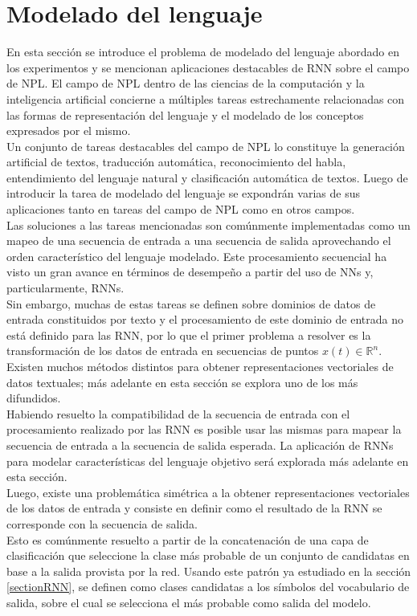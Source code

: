 \documentclass{article}
\begin{document}
	\pagebreak
	
	\section{Modelado del lenguaje}\label{sectionLanguageModeling}
	En esta sección se introduce el problema de modelado del lenguaje abordado en los experimentos y se mencionan aplicaciones destacables de RNN sobre el campo de NPL. El campo de NPL dentro de las ciencias de la computación y la inteligencia artificial concierne a múltiples tareas estrechamente relacionadas con las formas de representación del lenguaje y el modelado de los conceptos expresados por el mismo. \\
	Un conjunto de tareas destacables del campo de NPL lo constituye la generación artificial de textos, traducción automática, reconocimiento del habla, entendimiento del lenguaje natural y clasificación automática de textos. Luego de introducir la tarea de modelado del lenguaje se expondrán varias de sus aplicaciones tanto en tareas del campo de NPL como en otros campos.\\
	
	Las soluciones a las tareas mencionadas son comúnmente implementadas como un mapeo de una secuencia de entrada a una secuencia de salida aprovechando el orden característico del lenguaje modelado. Este procesamiento secuencial ha visto un gran avance en términos de desempeño a partir del uso de NNs y, particularmente, RNNs.\\
	Sin embargo, muchas de estas tareas se definen sobre dominios de datos de entrada constituidos por texto y el procesamiento de este dominio de entrada no está definido para las RNN, por lo que el primer problema a resolver es la transformación de los datos de entrada en secuencias de puntos $x(t) \in \mathbb{R}^n$.\\
	Existen muchos métodos distintos para obtener representaciones vectoriales de datos textuales; más adelante en esta sección se explora uno de los más difundidos.\\
	
	Habiendo resuelto la compatibilidad de la secuencia de entrada con el procesamiento realizado por las RNN es posible usar las mismas para mapear la secuencia de entrada a la secuencia de salida esperada. La aplicación de RNNs para modelar características del lenguaje objetivo será explorada más adelante en esta sección.\\
	
	Luego, existe una problemática simétrica a la obtener representaciones vectoriales de los datos de entrada y consiste en definir como el resultado de la RNN se corresponde con la secuencia de salida.\\
	Esto es comúnmente resuelto a partir de la concatenación de una capa de clasificación que seleccione la clase más probable de un conjunto de candidatas en base a la salida provista por la red. Usando este patrón ya estudiado en la sección \ref{sectionRNN}, se definen como clases candidatas a los símbolos del vocabulario de salida, sobre el cual se selecciona el más probable como salida del modelo.\\
	
\end{document}
